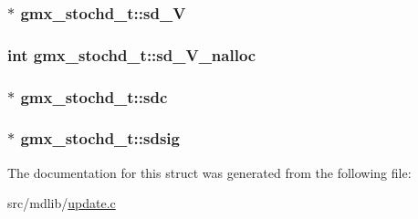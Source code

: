 \hypertarget{structgmx__stochd__t_ae694235bd35f80edf2cedf127d5af75b}{
\subsubsection[{sd\-\_\-\-V}]{$\ast$ {\bf gmx\-\_\-stochd\-\_\-t\-::sd\-\_\-\-V}}}\label{structgmx__stochd__t_ae694235bd35f80edf2cedf127d5af75b}
\hypertarget{structgmx__stochd__t_a2cf951411179d50bf04e7ca4b7202e08}{
\subsubsection[{sd\-\_\-\-V\-\_\-nalloc}]{\setlength{\rightskip}{0pt plus 5cm}int {\bf gmx\-\_\-stochd\-\_\-t\-::sd\-\_\-\-V\-\_\-nalloc}}}\label{structgmx__stochd__t_a2cf951411179d50bf04e7ca4b7202e08}
\hypertarget{structgmx__stochd__t_ab99a72bd2459cf085b2221faed78b79c}{
\subsubsection[{sdc}]{$\ast$ {\bf gmx\-\_\-stochd\-\_\-t\-::sdc}}}\label{structgmx__stochd__t_ab99a72bd2459cf085b2221faed78b79c}
\hypertarget{structgmx__stochd__t_afc4e2b6aed10e71f0f8ebc2cfd51b79f}{
\subsubsection[{sdsig}]{$\ast$ {\bf gmx\-\_\-stochd\-\_\-t\-::sdsig}}}\label{structgmx__stochd__t_afc4e2b6aed10e71f0f8ebc2cfd51b79f}


\-The documentation for this struct was generated from the following file\-:\begin{DoxyCompactItemize}
\item 
src/mdlib/\hyperlink{update_8c}{update.\-c}\end{DoxyCompactItemize}
